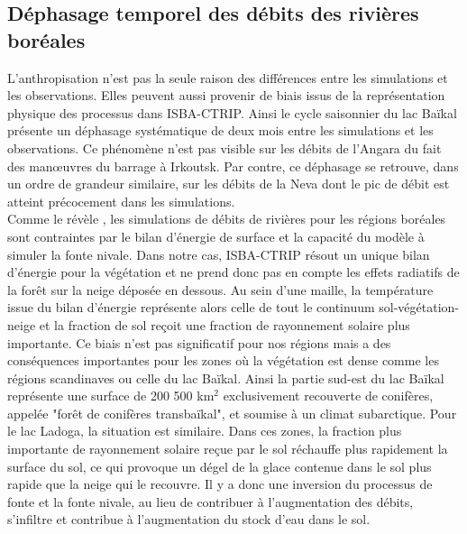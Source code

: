 \subsection{{\selectfont Déphasage temporel des débits des rivières boréales}}

L'anthropisation n'est pas la seule raison des différences entre les simulations et les observations. Elles peuvent aussi provenir de biais issus de la représentation physique des processus dans ISBA-CTRIP. Ainsi le cycle saisonnier du lac Baïkal présente un déphasage systématique de deux mois entre les simulations et les observations. Ce phénomène n'est pas visible sur les débits de l'Angara du fait des manœuvres du barrage à Irkoutsk. Par contre, ce déphasage se retrouve, dans un ordre de grandeur similaire, sur les débits de la Neva dont le pic de débit est atteint précocement dans les simulations.\\

Comme le révèle \citet{decharme2019}, les simulations de débits de rivières pour les régions boréales sont contraintes par le bilan d'énergie de surface et la capacité du modèle à simuler la fonte nivale. Dans notre cas, ISBA-CTRIP résout un unique bilan d'énergie pour la végétation et ne prend donc pas en compte les effets radiatifs de la forêt sur la neige déposée en dessous. Au sein d'une maille, la température issue du bilan d'énergie représente alors celle de tout le continuum sol-végétation-neige et la fraction de sol reçoit une fraction de rayonnement solaire plus importante. Ce biais n'est pas significatif pour nos régions mais a des conséquences importantes pour les zones où la végétation est dense comme les régions scandinaves ou celle du lac Baïkal. Ainsi la partie sud-est du lac Baïkal représente une surface de 200 500 km$^{2}$ exclusivement recouverte de conifères, appelée "forêt de conifères transbaïkal", et soumise à un climat subarctique. Pour le lac Ladoga, la situation est similaire. Dans ces zones, la fraction plus importante de rayonnement solaire reçue par le sol réchauffe plus rapidement la surface du sol, ce qui provoque un dégel de la glace contenue dans le sol plus rapide que la neige qui le recouvre. Il y a donc une inversion du processus de fonte et la fonte nivale, au lieu de contribuer à l'augmentation des débits, s'infiltre et contribue à l'augmentation du stock d'eau dans le sol.\\

